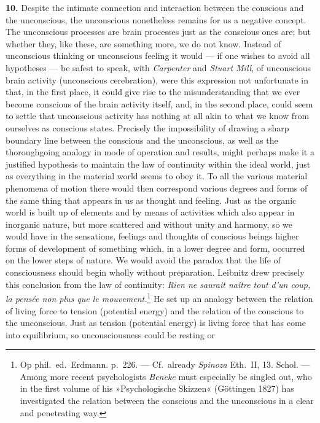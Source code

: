 \documentclass[12pt,a4paper]{book}
\newcommand{\opage}[1]{\marginnote{\footnotesize\textit{[#1]}}}
\begin{document}
\textbf{10.} Despite the intimate connection and interaction between the
conscious and the unconscious, the unconscious nonetheless remains for us
a negative concept. The unconscious processes are brain processes just as
the conscious ones are; but whether they, like these, are something more,
we do not know. Instead of unconscious thinking or unconscious feeling it
would --- if one wishes to avoid all hypotheses --- be safest to speak,
with \emph{Carpenter} and \emph{Stuart Mill}, of unconscious brain
activity (unconscious cerebration), were this expression not unfortunate
in that, in the first place, it could give rise to the misunderstanding
that we ever become conscious of the brain activity itself, and, in the
second place, could seem to settle that unconscious activity has nothing
at all akin to what we know from ourselves as conscious states. Precisely
the impossibility of drawing a sharp boundary line between the conscious
and the unconscious, as well as the thoroughgoing analogy in mode of
operation and results, might perhaps make it a justified hypothesis to
maintain the law of continuity within the ideal world, just as everything
in the material world seems to obey it. To all the various material
phenomena of motion there would then correspond various degrees and forms
of the same thing that appears in us as thought and feeling. Just as the
organic world is built up of elements and by means of activities which
also appear in inorganic nature, but more scattered and without unity and
harmony, so we would have in the sensations, feelings and thoughts of
conscious beings higher forms of development of something which, in a
lower degree and form, occurred
\opage{97}on the lower steps of nature. We would avoid the paradox that
the life of consciousness should begin wholly without preparation.
Leibnitz drew precisely this conclusion from the law of continuity:
\textit{Rien ne saurait naître tout d’un coup, la pensée non plus que le
mouvement.}\footnote{Op phil.\ ed.\ Erdmann. p.~226. --- Cf.\ already
\emph{Spinoza} Eth.\ II, 13. Schol. --- Among more recent psychologists
\emph{Beneke} must especially be singled out, who in the first volume of
his »Psychologische Skizzen« (Göttingen 1827) has investigated the
relation between the conscious and the unconscious in a clear and
penetrating way.} He set up an analogy between the relation of living
force to tension (potential energy) and the relation of the conscious to
the unconscious. Just as tension (potential energy) is living force that
has come into equilibrium, so unconsciousness could be resting or
\end{document}
